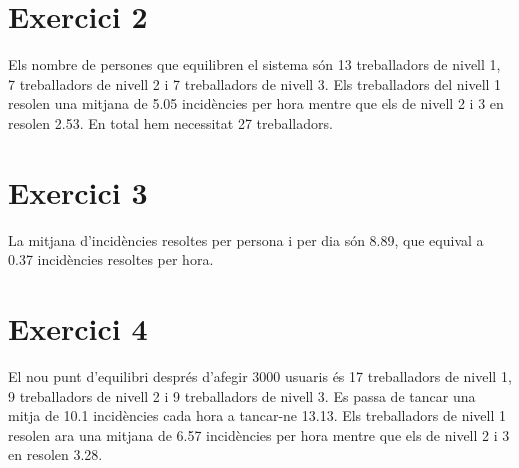 \documentclass[11pt,a4paper,twoside]{report}
\begin{document}
\begin{figure}%
  \centering
\end{figure}

\newpage
\section{Exercici 2}
Els nombre de persones que equilibren el sistema són 13 treballadors de nivell 1, 7 treballadors de nivell 2 i 7 treballadors de nivell 3.
\newline Els treballadors del nivell 1 resolen una mitjana de 5.05 incidències per hora mentre que els de nivell 2 i 3 en resolen 2.53.
En total hem necessitat 27 treballadors.

\section{Exercici 3}
La mitjana d'incidències resoltes per persona i per dia són 8.89, que equival a 0.37 incidències resoltes per hora.

\section{Exercici 4}
El nou punt d'equilibri després d'afegir 3000 usuaris és 17 treballadors de nivell 1, 9 treballadors de nivell 2 i 9 treballadors de nivell 3.
\newline Es passa de tancar una mitja de 10.1 incidències cada hora a tancar-ne 13.13.  
\newline Els treballadors de nivell 1 resolen ara una mitjana de 6.57 incidències per hora mentre que els de nivell 2 i 3 en resolen 3.28.
\end{document}

